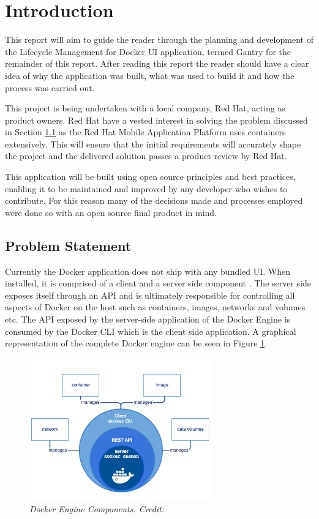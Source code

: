 \section{Introduction}
\label{sec:intro}
This report will aim to guide the reader through the planning and development of the Lifecycle Management for Docker \gls{UI} application, termed Gantry for the remainder of this report. After reading this report the reader should have a clear idea of why the application was built, what was used to build it and how the process was carried out.

This project is being undertaken with a local company, Red Hat, acting as product owners. Red Hat have a vested interest in solving the problem discussed in Section \ref{sub:problem} as the Red Hat Mobile Application Platform uses containers extensively. This will ensure that the initial requirements will accurately shape the project and the delivered solution passes a product review by Red Hat.

This application will be built using open source principles and best practices, enabling it to be maintained and improved by any developer who wishes to contribute. For this reason many of the decisions made and processes employed were done so with an open source final product in mind.

\subsection{Problem Statement}
\label{sub:problem}
Currently the \gls{Docker} application does not ship with any bundled \gls{UI}. When installed, it is comprised of a client and a server side component \citep{Docker2017}. The server side exposes itself through an \gls{API} and is ultimately responsible for controlling all aspects of Docker on the host such as containers, images, networks and volumes etc. The API exposed by the server-side application of the Docker Engine is consumed by the Docker \gls{CLI} which is the client side application. A graphical representation of the complete Docker engine can be seen in Figure \ref{fig:docker_engine}.

\begin{figure}[!ht]
\centering
\includegraphics*[width=0.7\textwidth]{images/docker_engine}
\caption{\em Docker Engine Components. Credit: \citep{Docker2017}}
\label{fig:docker_engine}
\end{figure}

